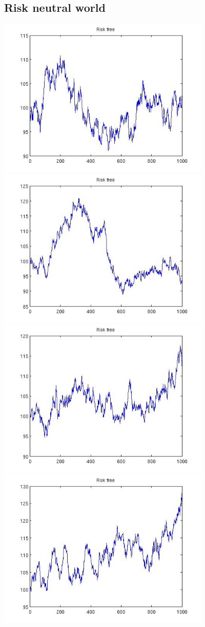 \documentclass[12pt]{article}
\begin{document}
  \subsection{Risk neutral world}
  \begin{center}
    \includegraphics[width=4in]{riskfree1.jpg}
    \includegraphics[width=4in]{riskfree2.jpg}
    \includegraphics[width=4in]{riskfree3.jpg}
    \includegraphics[width=4in]{riskfree4.jpg}

\end{center}
\end{document}
